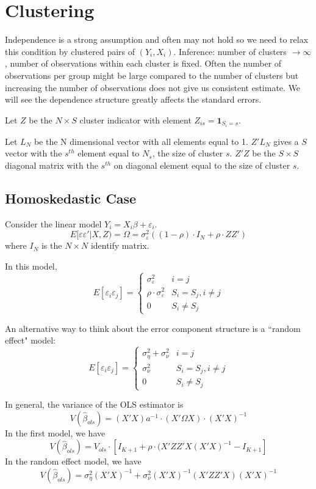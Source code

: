 \documentclass[11pt, a4paper, oneside]{article}
\theoremstyle{definition}
\theoremstyle{proposition}
\theoremstyle{corollary}
\theoremstyle{lemma}
\theoremstyle{theorem}
\begin{document}
\section{Clustering}
Independence is a strong assumption and often may not hold so we need to relax this condition by clustered pairs of $(Y_i, X_i)$. Inference: number of clusters $\to \infty$, number of observations within each cluster is fixed. Often the number of observations per group might be large compared to the number of clusters but increasing the number of observations does not give us consistent estimate. We will see the dependence structure greatly affects the standard errors. 

Let $Z$ be the $N\times S$ cluster indicator with element $Z_{is} = \mathbf{1}_{S_i=s}$.

Let $L_N$ be the N dimensional vector with all elements equal to 1. $Z'L_N$ gives a $S$ vector with the $s^{th}$ element equal to $N_s$, the size of cluster $s$. $Z'Z$ be the $S\times S$ diagonal matrix with the $s^{th}$ on diagonal element equal to the size of cluster $s$. 

\subsection{Homoskedastic Case}
Consider the linear model $Y_i = X_i\beta + \varepsilon_i$. 
$$E[\varepsilon\varepsilon'|X, Z) = \Omega = \sigma_{\varepsilon}^2((1-\rho)\cdot I_N + \rho\cdot ZZ')$$
where $I_N$ is the $N \times N$ identify matrix. 

In this model, 
$$E[\varepsilon_i\varepsilon_j] = \begin{cases}
\sigma_{\varepsilon}^2 & i=j \\
\rho \cdot \sigma_{\varepsilon}^2 & S_i = S_j, i \neq j\\
0 & S_i \neq S_j
\end{cases}$$ 

An alternative way to think about the error component structure is a ``random effect" model:
$$E[\varepsilon_i\varepsilon_j] = \begin{cases}
\sigma_{\eta}^2 + \sigma_{\nu}^2 & i = j \\
\sigma_{\nu}^2 & S_i = S_j, i \neq j \\
0 & S_i \neq S_j\end{cases}$$

In general, the variance of the OLS estimator is $$V(\hat{\beta}_{ols}) = (X'X) a ^{-1}\cdot (X' \Omega X) \cdot (X'X)^{-1}$$
In the first model, we have
$$V(\hat{\beta}_{ols})  = V_{ols} \cdot [I_{K+1} + \rho \cdot (X'ZZ'X(X'X)^{-1}- I_{K+1}]$$
In the random effect model, we have
$$V(\hat{\beta}_{ols})  = \sigma_{\eta}^2(X'X)^{-1} + \sigma_{\nu}^2(X'X)^{-1} (X'ZZ'X)(X'X)^{-1}$$
\end{document}

